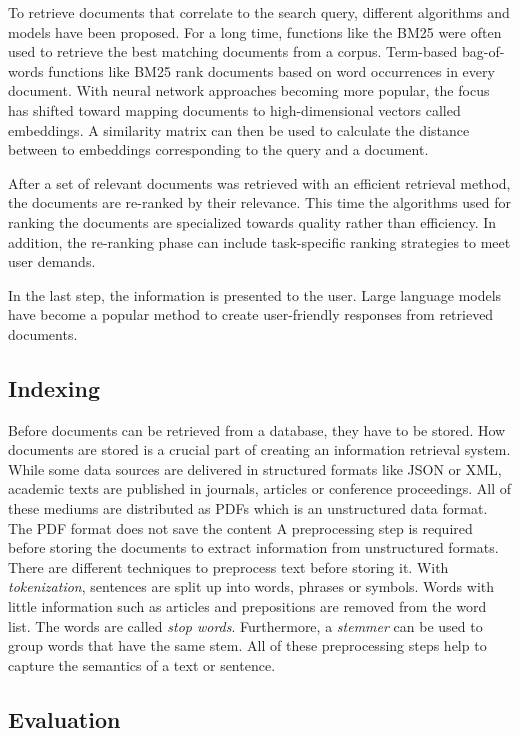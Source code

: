 \documentclass[../main.tex]{subfiles}
\begin{document}
To retrieve documents that correlate to the search query,
different algorithms and models have been proposed.
For a long time, functions like the BM25 \cite{Robertson2009}
were often used to retrieve the best matching documents from a corpus.
Term-based bag-of-words functions like BM25 rank documents based on word occurrences in every document.
With neural network approaches becoming more popular,
the focus has shifted toward mapping documents to high-dimensional vectors called embeddings.
A similarity matrix can then be used to calculate the distance between to embeddings corresponding to the query and a document.

After a set of relevant documents was retrieved with an efficient retrieval method,
the documents are re-ranked by their relevance.
This time the algorithms used for ranking the documents are specialized towards quality rather than efficiency.
In addition, the re-ranking phase can include task-specific ranking strategies to meet user demands.

In the last step, the information is presented to the user.
Large language models have become a popular method to create user-friendly responses from retrieved documents.

\subsection{Indexing}

Before documents can be retrieved from a database,
they have to be stored.
How documents are stored is a crucial part of creating an information retrieval system.
While some data sources are delivered in structured formats like JSON or XML,
academic texts are published in journals, articles or conference proceedings.
All of these mediums are distributed as PDFs which is an unstructured data format.
The PDF format does not save the content
A preprocessing step is required before storing the documents to extract information from unstructured formats.
There are different techniques to preprocess text before storing it.
With \emph{tokenization}, sentences are split up into words, phrases or symbols.
Words with little information such as articles and prepositions are removed from the word list.
The words are called \emph{stop words}.
Furthermore, a \emph{stemmer} can be used to group words that have the same stem.
All of these preprocessing steps help to capture the semantics of a text or sentence.


\subsection{Evaluation}
\end{document}
